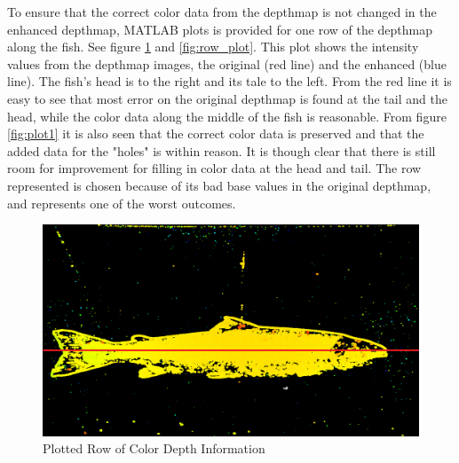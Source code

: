 To ensure that the correct color data from the depthmap is not changed in the enhanced depthmap, MATLAB plots is provided for one row of the depthmap along the fish. See figure \ref{fig:sectional} and \ref{fig:row_plot}. This plot shows the intensity values from the depthmap images, the original (red line) and the enhanced (blue line). The fish's head is to the right and its tale to the left. From the red line it is easy to see that most error on the original depthmap is found at the tail and the head, while the color data along the middle of the fish is reasonable. From figure \ref{fig:plot1} it is also seen that the correct color data is preserved and that the added data for the "holes" is within reason. It is though clear that there is still room for improvement for filling in color data at the head and tail. 
The row represented is chosen because of its bad base values in the original depthmap, and represents one of the worst outcomes.


\begin{figure}[H]
    \centering
    \includegraphics[width=.7\linewidth]{images/results/sectional}
    \caption{Plotted Row of Color Depth Information}
    \label{fig:sectional}
\end{figure}


